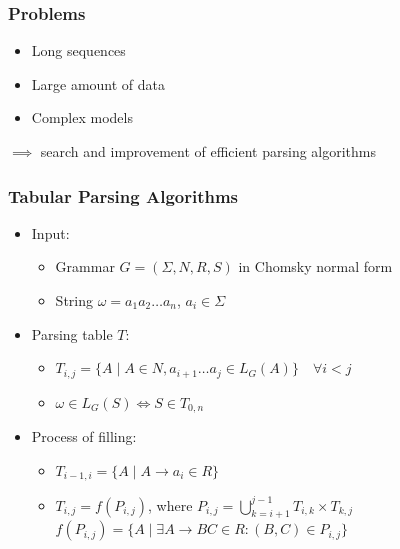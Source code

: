 \documentclass[xcolor=table]{beamer}
\begin{document}
\begin{frame}[fragile] \frametitle{Problems}

    \begin{itemize}
        \item Long sequences
        \item Large amount of data
        \item Complex models
        \hspace{20pt}
    \end{itemize} 
    $\implies$ search and improvement of efficient parsing algorithms

\end{frame}



\begin{frame}[fragile] \frametitle{Tabular Parsing Algorithms}

\begin{itemize}
    \item Input:
    \begin{itemize}
        \item Grammar $G = (\Sigma, N, R, S)$ in Chomsky normal form
        \item String $\omega = a_{1}a_{2} \dots a_{n}$, $a_i \in \Sigma$
    \end{itemize}
    \item Parsing table $T$:
        \begin{itemize}
            \item $T_{i, j} =  \{ A \mid A \in N, a_{i + 1} \dots a_{j} \in L_{G}(A)\} \quad \forall i < j$
            \item $\omega \in L_{G}(S) \iff S \in T_{0, n}$
        \end{itemize}
    \item Process of filling:
        \begin{itemize}
            \item $T_{i - 1, i} = \{ A \mid A \rightarrow a_{i} \in R\}$
            \vspace{5pt}
            \item $T_{i, j} = f(P_{i, j})$, where $P_{i, j} = \bigcup\limits_{k = i + 1}^{j - 1} T_{i,k} \times T_{k, j}$ \\ 
            \hspace{85pt} $f(P_{i, j}) = \{A \mid \exists A \rightarrow BC \in R : (B, C) \in P_{i, j}\}$
        \end{itemize}
    \end{itemize}
\end{frame}
\end{document}
